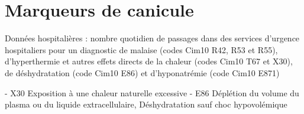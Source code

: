 \documentclass[12pt,english,french,twoside]{report}\usepackage[]{graphicx}\usepackage[]{color}
\begin{document}
\section{Marqueurs de canicule}

Données hospitalières : nombre quotidien de passages dans des services d'urgence hospitaliers pour un diagnostic de malaise (codes Cim10 R42, R53 et R55), d'hyperthermie et autres effets directs de la chaleur (codes Cim10 T67 et X30), de déshydratation (code Cim10 E86) et d'hyponatrémie (code Cim10 E871)

- X30  Exposition à une chaleur naturelle excessive
- E86  Déplétion du volume du plasma ou du liquide extracellulaire, Déshydratation sauf choc hypovolémique
\end{document}
